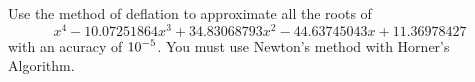 
\begin{question}
Use the method of deflation to approximate all the roots of
\[
x^4-10.07251864 x^3+34.83068793 x^2-44.63745043 x+11.36978427
\]
with an acuracy of $\displaystyle 10^{-5}$.
You must use Newton's method with Horner's Algorithm.
\end{question}


